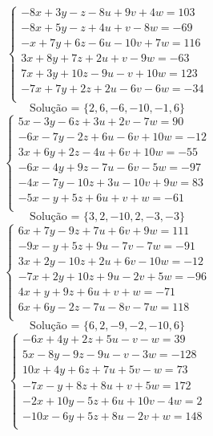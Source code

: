 \documentclass[12pt,oneside,a4paper]{article}
\begin{document}
\vspace{\baselineskip}
\begin{equation*}
\begin{cases}
-8x+3y-z-8u+9v+4w=103 \\
-8x+5y-z+4u+v-8w=-69 \\
-x+7y+6z-6u-10v+7w=116 \\
3x+8y+7z+2u+v-9w=-63 \\
7x+3y+10z-9u-v+10w=123 \\
-7x+7y+2z+2u-6v-6w=-34 \\
\end{cases}
\end{equation*}
\begin{equation*}
\text{Solução = }\{2,6,-6,-10,-1,6\}
\end{equation*}
\vspace{\baselineskip}
\begin{equation*}
\begin{cases}
5x-3y-6z+3u+2v-7w=90 \\
-6x-7y-2z+6u-6v+10w=-12 \\
3x+6y+2z-4u+6v+10w=-55 \\
-6x-4y+9z-7u-6v-5w=-97 \\
-4x-7y-10z+3u-10v+9w=83 \\
-5x-y+5z+6u+v+w=-61 \\
\end{cases}
\end{equation*}
\begin{equation*}
\text{Solução = }\{3,2,-10,2,-3,-3\}
\end{equation*}
\vspace{\baselineskip}
\begin{equation*}
\begin{cases}
6x+7y-9z+7u+6v+9w=111 \\
-9x-y+5z+9u-7v-7w=-91 \\
3x+2y-10z+2u+6v-10w=-12 \\
-7x+2y+10z+9u-2v+5w=-96 \\
4x+y+9z+6u+v+w=-71 \\
6x+6y-2z-7u-8v-7w=118 \\
\end{cases}
\end{equation*}
\begin{equation*}
\text{Solução = }\{6,2,-9,-2,-10,6\}
\end{equation*}
\vspace{\baselineskip}
\begin{equation*}
\begin{cases}
-6x+4y+2z+5u-v-w=39 \\
5x-8y-9z-9u-v-3w=-128 \\
10x+4y+6z+7u+5v-w=73 \\
-7x-y+8z+8u+v+5w=172 \\
-2x+10y-5z+6u+10v-4w=2 \\
-10x-6y+5z+8u-2v+w=148 \\
\end{cases}
\end{equation*}
\end{document}
